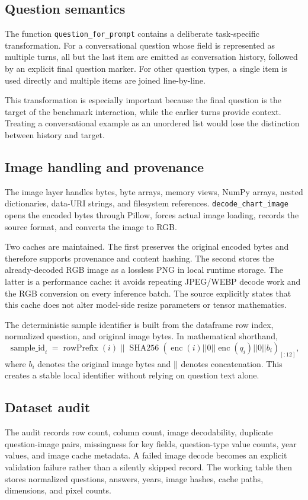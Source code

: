 \documentclass[11pt,a4paper]{article}
\newcommand{\code}[1]{\texttt{#1}}
\begin{document}
\subsection{Question semantics}
The function \code{question\_for\_prompt} contains a deliberate task-specific transformation. For a conversational question whose field is represented as multiple turns, all but the last item are emitted as conversation history, followed by an explicit final question marker. For other question types, a single item is used directly and multiple items are joined line-by-line.

This transformation is especially important because the final question is the target of the benchmark interaction, while the earlier turns provide context. Treating a conversational example as an unordered list would lose the distinction between history and target.

\subsection{Image handling and provenance}
The image layer handles bytes, byte arrays, memory views, NumPy arrays, nested dictionaries, data-URI strings, and filesystem references. \code{decode\_chart\_image} opens the encoded bytes through Pillow, forces actual image loading, records the source format, and converts the image to RGB.

Two caches are maintained. The first preserves the original encoded bytes and therefore supports provenance and content hashing. The second stores the already-decoded RGB image as a lossless PNG in local runtime storage. The latter is a performance cache: it avoids repeating JPEG/WEBP decode work and the RGB conversion on every inference batch. The source explicitly states that this cache does not alter model-side resize parameters or tensor mathematics.

The deterministic sample identifier is built from the dataframe row index, normalized question, and original image bytes. In mathematical shorthand,
\begin{equation}
\operatorname{sample\_id}_i
=
\operatorname{rowPrefix}(i)\;||\;
\operatorname{SHA256}\!\left(
\operatorname{enc}(i) || 0 || \operatorname{enc}(q_i) || 0 || b_i
\right)_{[:12]},
\end{equation}
where \(b_i\) denotes the original image bytes and \(||\) denotes concatenation. This creates a stable local identifier without relying on question text alone.

\subsection{Dataset audit}
The audit records row count, column count, image decodability, duplicate question-image pairs, missingness for key fields, question-type value counts, year values, and image cache metadata. A failed image decode becomes an explicit validation failure rather than a silently skipped record. The working table then stores normalized questions, answers, years, image hashes, cache paths, dimensions, and pixel counts.
\end{document}
